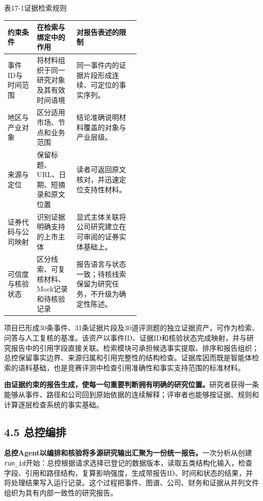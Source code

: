 \begin{center}\small 表17-1\quad 证据检索规则\par\vspace{1mm}
\begin{tabularx}{\linewidth}{p{0.22\linewidth}p{0.30\linewidth}X}
\toprule
约束条件 & 在检索与绑定中的作用 & 对报告表述的限制\\
\midrule
事件ID与时间范围 & 将材料组织于同一研究对象及其有效时间语境 & 同一事件内的证据片段形成连续、可定位的事实序列。\\
地区与产业对象 & 区分适用市场、节点和业务范围 & 结论准确说明材料覆盖的对象与产业层级。\\
来源与定位 & 保留标题、URL、日期、短摘录和原文位置 & 读者可返回原文核对，并迅速定位支持性材料。\\
证券代码与公司映射 & 识别证据明确支持的上市主体 & 显式主体关联将公司研究建立在可审阅的证券实体基础上。\\
可信度与核验状态 & 区分线索、可复核材料、Mock记录和待核验记录 & 报告语言与状态一致；待核线索保留为研究任务，不升级为确定性陈述。\\
\bottomrule
\end{tabularx}\end{center}

项目已形成30条事件、31条证据片段及30道评测题的独立证据资产，可作为检索、问答与人工复核的基准\cite{lhy-evidence}。该资产以事件ID、证据ID和核验状态完成映射，并与研究报告中的引用字段直接关联。检索模块可承担候选事实提取、排序和报告组织；总控保留事实边界、来源归属和引用完整性的结构检查。证据库因而既是智能体检索的语料基础，也是竞赛评测中检查引用准确性和事实支持范围的标准材料。

\noindent\textbf{由证据约束的报告生成，使每一句重要判断拥有明确的研究位置。}研究者获得一条能够从事件、路径和公司回到原始依据的连续解释；评审者也能够按证据、规则和计算逐层检查系统的事实基础。


\subsection*{4.5 总控编排}\label{page:18}
\noindent\textbf{总控Agent以编排和核验将多源研究输出汇聚为一份统一报告。}一次分析从创建\texttt{run\_id}开始：总控根据请求选择已登记的数据版本，读取五类结构化输入，检查字段、引用和路径结构，复算影响强度，生成带报告ID、时间和状态的结果，并将处理结果写入运行记录。这个过程把事件、图谱、公司、财务和证据从并列文件组织为具有内部一致性的研究报告\cite{lhy-orchestrator,lhy-architecture}。


